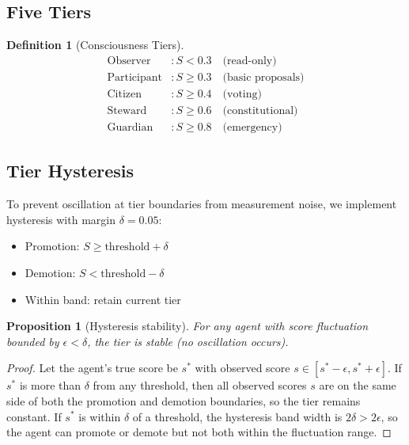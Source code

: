 \documentclass[11pt,twocolumn]{article}
\newtheorem{definition}{Definition}
\newtheorem{proposition}{Proposition}
\begin{document}
\subsection{Five Tiers}

\begin{definition}[Consciousness Tiers]
\begin{align}
  \text{Observer}     &: S < 0.3 \quad \text{(read-only)} \\
  \text{Participant}  &: S \geq 0.3 \quad \text{(basic proposals)} \\
  \text{Citizen}      &: S \geq 0.4 \quad \text{(voting)} \\
  \text{Steward}      &: S \geq 0.6 \quad \text{(constitutional)} \\
  \text{Guardian}     &: S \geq 0.8 \quad \text{(emergency)}
\end{align}
\end{definition}

\subsection{Tier Hysteresis}

To prevent oscillation at tier boundaries from measurement noise, we
implement hysteresis with margin $\delta = 0.05$:

\begin{itemize}[nosep]
  \item Promotion: $S \geq \text{threshold} + \delta$
  \item Demotion: $S < \text{threshold} - \delta$
  \item Within band: retain current tier
\end{itemize}

\begin{proposition}[Hysteresis stability]
For any agent with score fluctuation bounded by $\epsilon < \delta$, the
tier is stable (no oscillation occurs).
\end{proposition}

\begin{proof}
Let the agent's true score be $s^*$ with observed score $s \in [s^* - \epsilon, s^* + \epsilon]$.
If $s^*$ is more than $\delta$ from any threshold, then all observed scores
$s$ are on the same side of both the promotion and demotion boundaries,
so the tier remains constant. If $s^*$ is within $\delta$ of a threshold,
the hysteresis band width is $2\delta > 2\epsilon$, so the agent can
promote or demote but not both within the fluctuation range.
\end{proof}
\end{document}
